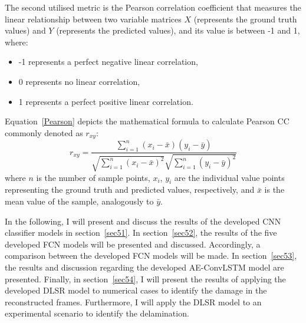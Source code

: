 The second utilised metric is the Pearson correlation coefficient that measures the linear relationship between two variable matrices \textbf{\(X\)} (represents the ground truth values) and \textbf{\(Y\)} (represents the predicted values), and its value is between -1 and 1, where:
\begin{itemize}
	\item -1 represents a perfect negative linear correlation,
	\item 0 represents no linear correlation,
	\item 1 represents a perfect positive linear correlation.
\end{itemize}
Equation~\ref{Pearson} depicts the mathematical formula to calculate Pearson CC commonly denoted as \(r_{xy}\):
\begin{equation}
	r_{xy} = \frac{\sum_{i=1}^{n}(x_i - \bar{x})(y_i-\bar{y})}{\sqrt{\sum_{i=1}^{n}(x_i - \bar{x})^2}\sqrt{\sum_{i=1}^{n}(y_i - \bar{y})^2}}
	\label{Pearson}
\end{equation}
where \(n\) is the number of sample points, \(x_i\), \(y_i\) are the individual value points representing the ground truth and predicted values, respectively, and \(\bar{x}\) is the mean value of the sample, analogously to \(\bar{y}\).


In the following, I will present and discuss the results of the developed CNN classifier models in section~\ref{sec51}. 
In section~\ref{sec52}, the results of the five developed FCN models will be presented and discussed.
Accordingly, a comparison between the developed FCN models will be made.
In section~\ref{sec53}, the results and discussion regarding the developed AE-ConvLSTM model are presented.
Finally, in section~\ref{sec54}, I will present the results of applying the developed DLSR model to numerical cases to identify the damage in the reconstructed frames.
Furthermore, I will apply the DLSR model to an experimental scenario to identify the delamination.





